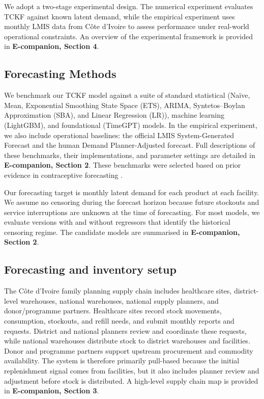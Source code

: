 \documentclass[
  11pt,
  authoryear,
  doubleblind,
  3p]{elsarticle}
\begin{document}
We adopt a two-stage experimental design. The numerical experiment
evaluates TCKF against known latent demand, while the empirical
experiment uses monthly LMIS data from Côte d'Ivoire to assess
performance under real-world operational constraints. An overview of the
experimental framework is provided in \textbf{E-companion, Section 4}.

\subsection{Forecasting Methods}\label{forecasting-methods}

We benchmark our TCKF model against a suite of standard statistical
(Naïve, Mean, Exponential Smoothing State Space (ETS), ARIMA,
Syntetos--Boylan Approximation (SBA), and Linear Regression (LR)),
machine learning (LightGBM), and foundational (TimeGPT) models. In the
empirical experiment, we also include operational baselines: the
official LMIS System-Generated Forecast and the human Demand
Planner-Adjusted forecast. Full descriptions of these benchmarks, their
implementations, and parameter settings are detailed in
\textbf{E-companion, Section 2}. These benchmarks were selected based on
prior evidence in contraceptive forecasting \citep{hewage2025}.

Our forecasting target is monthly latent demand for each product at each
facility. We assume no censoring during the forecast horizon because
future stockouts and service interruptions are unknown at the time of
forecasting. For most models, we evaluate versions with and without
regressors that identify the historical censoring regime. The candidate
models are summarised in \textbf{E-companion, Section 2}.

\subsection{Forecasting and inventory
setup}\label{forecasting-and-inventory-setup}

The Côte d'Ivoire family planning supply chain includes healthcare
sites, district-level warehouses, national warehouses, national supply
planners, and donor/programme partners. Healthcare sites record stock
movements, consumption, stockouts, and refill needs, and submit monthly
reports and requests. District and national planners review and
coordinate these requests, while national warehouses distribute stock to
district warehouses and facilities. Donor and programme partners support
upstream procurement and commodity availability. The system is therefore
primarily pull-based because the initial replenishment signal comes from
facilities, but it also includes planner review and adjustment before
stock is distributed. A high-level supply chain map is provided in
\textbf{E-companion, Section 3}.
\end{document}
